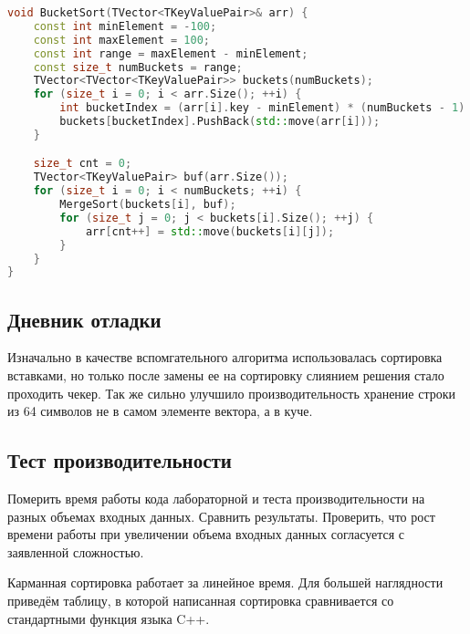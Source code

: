\documentclass[12pt]{article}
\begin{document}
\begin{itemize}
\begin{lstlisting}[language=C++]
void BucketSort(TVector<TKeyValuePair>& arr) {
    const int minElement = -100;
    const int maxElement = 100;
    const int range = maxElement - minElement;
    const size_t numBuckets = range;
    TVector<TVector<TKeyValuePair>> buckets(numBuckets);
    for (size_t i = 0; i < arr.Size(); ++i) {
        int bucketIndex = (arr[i].key - minElement) * (numBuckets - 1) / range;
        buckets[bucketIndex].PushBack(std::move(arr[i]));
    }

    size_t cnt = 0;
    TVector<TKeyValuePair> buf(arr.Size());
    for (size_t i = 0; i < numBuckets; ++i) {
        MergeSort(buckets[i], buf);
        for (size_t j = 0; j < buckets[i].Size(); ++j) {
            arr[cnt++] = std::move(buckets[i][j]);
        }
    }
}
        \end{lstlisting}
\end{itemize}

\subsection*{Дневник отладки}

Изначально в качестве вспомгательного алгоритма использовалась сортировка вставками, но только после замены ее на сортировку слиянием решения стало проходить чекер.
Так же сильно улучшило производительность хранение строки из 64 символов не в самом элементе вектора, а в куче. 

\subsection*{Тест производительности}

Померить время работы кода лабораторной и теста производительности
на разных объемах входных данных. Сравнить результаты. Проверить,
что рост времени работы при увеличении объема входных данных
согласуется с заявленной сложностью.

Карманная сортировка работает за линейное время. Для большей наглядности приведём таблицу, в которой написанная сортировка сравнивается со стандартными функция языка C++.
\end{document}
